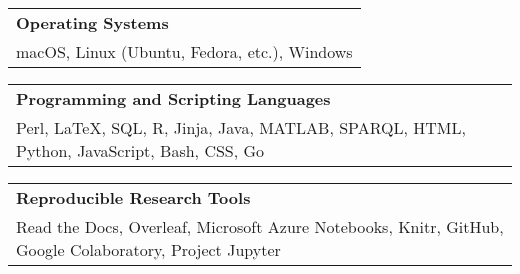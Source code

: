 \documentclass[10pt, letterpaper]{article}
\newcommand{\tabularxwidth}{\textwidth}
\begin{document}
        
            \vspace{.5em}
        

    
        \begin{tabularx}{\tabularxwidth}{X}
            \textbf{Operating Systems} \\
            
            macOS, 
            Linux (Ubuntu, Fedora, etc.), 
            Windows \\
        \end{tabularx}

        
            \vspace{.5em}
        

    
        \begin{tabularx}{\tabularxwidth}{X}
            \textbf{Programming and Scripting Languages} \\
            
            Perl, 
            LaTeX, 
            SQL, 
            R, 
            Jinja, 
            Java, 
            MATLAB, 
            SPARQL, 
            HTML, 
            Python, 
            JavaScript, 
            Bash, 
            CSS, 
            Go \\
        \end{tabularx}

        
            \vspace{.5em}
        

    
        \begin{tabularx}{\tabularxwidth}{X}
            \textbf{Reproducible Research Tools} \\
            
            Read the Docs, 
            Overleaf, 
            Microsoft Azure Notebooks, 
            Knitr, 
            GitHub, 
            Google Colaboratory, 
            Project Jupyter \\
        \end{tabularx}
\end{document}
